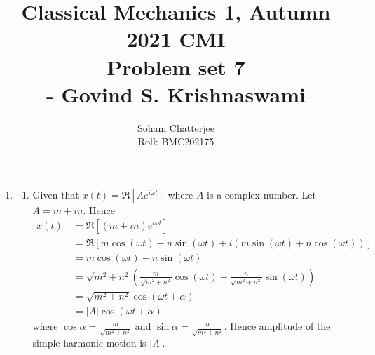 \documentclass{article}
\title{\huge{Classical Mechanics 1, Autumn 2021 CMI \\ Problem set 7\\\hspace{7cm}- Govind S. Krishnaswami}
}
\author{Soham Chatterjee\\Roll: BMC202175}
\date{}
\begin{document}
	\maketitle\pagebreak
	\begin{enumerate}
		\item \begin{enumerate}
			\item Given that $x(t)=\Re \left[Ae^{i\omega t}\right]$ where $A$ is a complex number. Let $A=m+in$. Hence \begin{align*}
				x(t)\ &=\Re\left[(m+in)e^{i\omega t}\right]\\
				&= \Re\left[m\cos (\omega t) - n\sin(\omega t)+i(m\sin(\omega t)+n\cos(\omega t))\right]\\
				&= m\cos (\omega t) - n\sin(\omega t)\\
				&=\sqrt{m^2+n^2}\left( \frac{m}{\sqrt{m^2+n^2}} \cos(\omega t)-\frac{n}{\sqrt{m^2+n^2}}\sin(\omega t)\right)\\
				&=\sqrt{m^2+n^2}\cos(\omega t +\alpha)\\
				&=|A|\cos(\omega t +\alpha)
			\end{align*}where $\cos\alpha=\frac{m}{\sqrt{m^2+n^2}}$ and $\sin\alpha=\frac{n}{\sqrt{m^2+n^2}}$. 	
		Hence amplitude of the simple harmonic motion is $|A|$.
		

\end{enumerate}
\end{enumerate}
\end{document}
